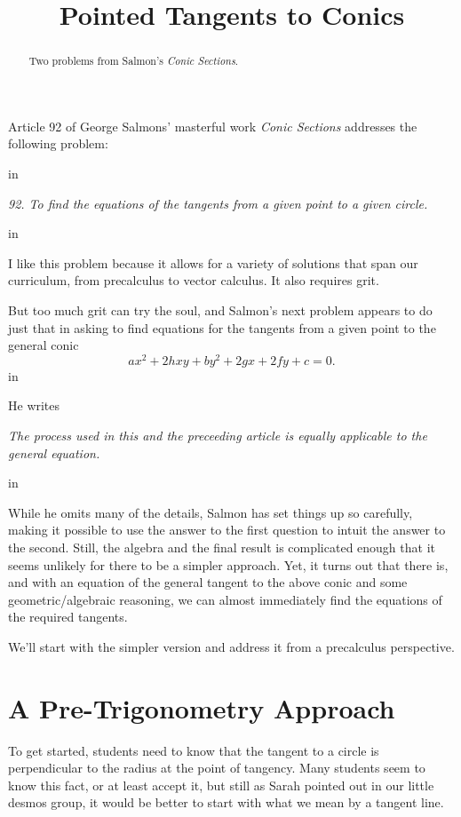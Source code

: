 \documentclass{ximera}
\title{Pointed Tangents to Conics}
\newcommand{\pskip}{\vskip 0.1 in}
\begin{document}
\begin{abstract}
Two problems from Salmon's \emph{Conic Sections}.
\end{abstract}
\maketitle

Article 92 of George Salmons' masterful work \emph{Conic Sections} addresses the following problem:

\pskip

\emph{92. To find the equations of the tangents from a given point to a given circle.}

\pskip

I like this problem because it allows for a variety of solutions that span our curriculum, from precalculus to vector calculus. It also requires grit. 

But too much grit can try the soul, and Salmon's next problem appears to do just that in asking to find equations for the tangents from a given point to the general conic
\[
   ax^2 + 2hxy + by^2 + 2gx + 2fy + c = 0.
\]
\pskip

He writes

\emph{The process used in this and the preceeding article is equally applicable to the general equation.}

\pskip

While he omits many of the details, Salmon has set things up so carefully, making it possible to use the answer to the first question to intuit the answer to the second. Still, the algebra and the final result is complicated enough that it seems unlikely for there to be a simpler approach. Yet, it turns out that there is, and with an equation of the general tangent to the above conic and some geometric/algebraic reasoning, we can almost immediately find the equations of the required tangents.

We'll start with the simpler version and address it from a precalculus perspective.

\section{A Pre-Trigonometry Approach}
To get started, students need to know that the tangent to a circle is perpendicular to the radius at the point of tangency. Many students seem to know this fact, or at least accept it, but still as Sarah pointed out in our little desmos group, it would be better to start with what we mean by a tangent line.
\end{document}
